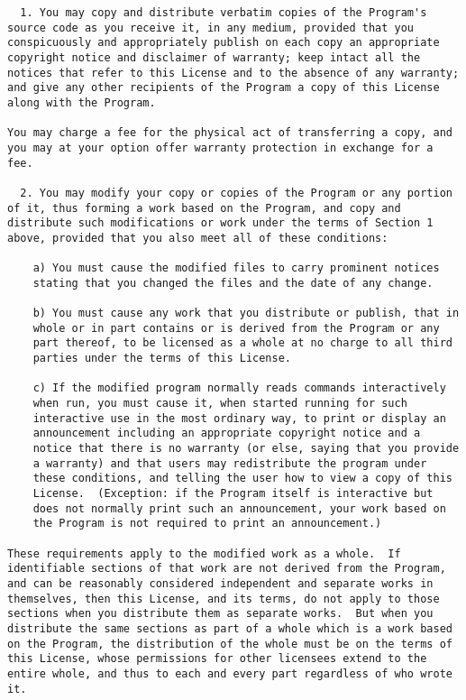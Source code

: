 \documentclass{article}
\begin{document}
\begin{appendix}
\begin{verbatim}
  1. You may copy and distribute verbatim copies of the Program's
source code as you receive it, in any medium, provided that you
conspicuously and appropriately publish on each copy an appropriate
copyright notice and disclaimer of warranty; keep intact all the
notices that refer to this License and to the absence of any warranty;
and give any other recipients of the Program a copy of this License
along with the Program.

You may charge a fee for the physical act of transferring a copy, and
you may at your option offer warranty protection in exchange for a fee.

  2. You may modify your copy or copies of the Program or any portion
of it, thus forming a work based on the Program, and copy and
distribute such modifications or work under the terms of Section 1
above, provided that you also meet all of these conditions:

    a) You must cause the modified files to carry prominent notices
    stating that you changed the files and the date of any change.

    b) You must cause any work that you distribute or publish, that in
    whole or in part contains or is derived from the Program or any
    part thereof, to be licensed as a whole at no charge to all third
    parties under the terms of this License.

    c) If the modified program normally reads commands interactively
    when run, you must cause it, when started running for such
    interactive use in the most ordinary way, to print or display an
    announcement including an appropriate copyright notice and a
    notice that there is no warranty (or else, saying that you provide
    a warranty) and that users may redistribute the program under
    these conditions, and telling the user how to view a copy of this
    License.  (Exception: if the Program itself is interactive but
    does not normally print such an announcement, your work based on
    the Program is not required to print an announcement.)

These requirements apply to the modified work as a whole.  If
identifiable sections of that work are not derived from the Program,
and can be reasonably considered independent and separate works in
themselves, then this License, and its terms, do not apply to those
sections when you distribute them as separate works.  But when you
distribute the same sections as part of a whole which is a work based
on the Program, the distribution of the whole must be on the terms of
this License, whose permissions for other licensees extend to the
entire whole, and thus to each and every part regardless of who wrote it.


\end{verbatim}
\end{appendix}
\end{document}
